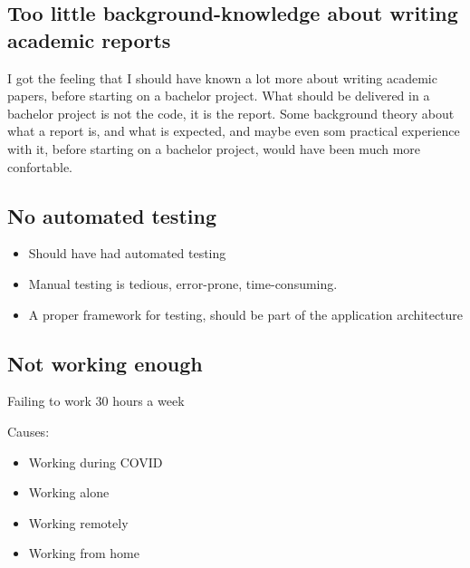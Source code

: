 \subsection{Too little background-knowledge about writing academic reports}

I got the feeling that I should have known a lot more about writing academic papers, before starting on a bachelor project. What should be delivered in a bachelor project is not the code, it is the report. Some background theory about what a report is, and what is expected, and maybe even som practical experience with it, before starting on a bachelor project, would have been much more confortable.



\subsection{No automated testing}

\begin{itemize}
    \item Should have had automated testing
    \item Manual testing is tedious, error-prone, time-consuming.
    \item A proper framework for testing, should be part of the application architecture
\end{itemize}





\subsection{Not working enough}

\item Failing to work 30 hours a week

Causes:
\begin{itemize}
    \item Working during COVID
    \item Working alone
    \item Working remotely
    \item Working from home
\end{itemize}
